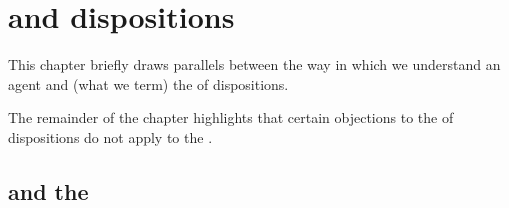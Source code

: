 \chapter{ and dispositions}
\label{cha:tc2-dispositions}


\begin{note}
  This chapter briefly draws parallels between the way in which we understand an agent \tC{} and (what we term) the  of dispositions.

  The remainder of the chapter highlights that certain objections to the  of dispositions do not apply to the .
\end{note}



\section{ and the }
\label{sec:dispositions}


